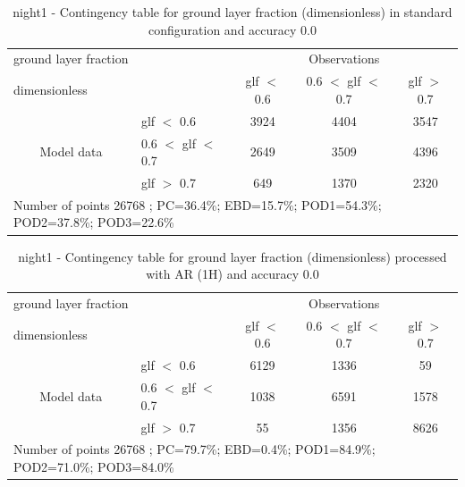 \clearpage
\begin{table}[p!]
\begin{center}
\begin{tabular}{llccc}
\hline
{ground layer fraction}                                       &                                                    & \multicolumn{3}{c}{Observations}                 \\
{dimensionless}                                       &                             & glf $<$ 0.6   & 0.6 $<$ glf $<$ 0.7 & glf $>$ 0.7 \\
\hline
\multicolumn{1}{c}{\multirow{3}{*}{Model data}}  & glf $<$ 0.6             & 3924                & 4404                       & 3547              \\
                                                 & 0.6  $<$ glf $<$ 0.7 & 2649                & 3509                       & 4396              \\
                                                 & glf $>$ 0.7             & 649                & 1370                       & 2320              \\
\hline
\multicolumn{5}{l}{ Number of points        26768 ; PC=36.4\%; EBD=15.7\%; POD1=54.3\%; POD2=37.8\%; POD3=22.6\%}
\end{tabular}
\end{center}
\caption{night1 - Contingency table for  ground layer fraction (dimensionless) in standard configuration and accuracy 0.0}
\label{tab:contingencyglfBEF:night1}
\end{table}
\begin{table}[p!]
\begin{center}
\begin{tabular}{llccc}
\hline
{ground layer fraction}                                       &                                                    & \multicolumn{3}{c}{Observations}                 \\
{dimensionless}                                       &                             & glf $<$ 0.6   & 0.6 $<$ glf $<$ 0.7 & glf $>$ 0.7 \\
\hline
\multicolumn{1}{c}{\multirow{3}{*}{Model data}}  & glf $<$ 0.6             & 6129                & 1336                       & 59              \\
                                                 & 0.6  $<$ glf $<$ 0.7 & 1038                & 6591                       & 1578              \\
                                                 & glf $>$ 0.7             & 55                & 1356                       & 8626              \\
\hline
\multicolumn{5}{l}{ Number of points        26768 ; PC=79.7\%; EBD=0.4\%; POD1=84.9\%; POD2=71.0\%; POD3=84.0\%}
\end{tabular}
\end{center}
\caption{night1 - Contingency table for  ground layer fraction (dimensionless) processed with AR (1H) and accuracy 0.0}
\label{tab:contingencyglfAFT:night1}
\end{table}
